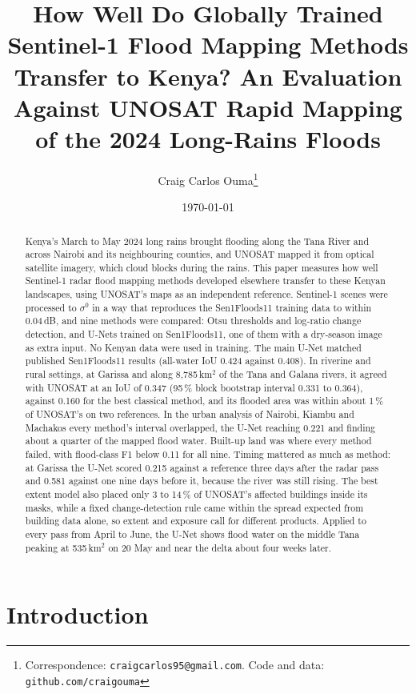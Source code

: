 \documentclass[11pt]{article}
\title{\textbf{How Well Do Globally Trained Sentinel-1 Flood Mapping Methods
Transfer to Kenya? An Evaluation Against UNOSAT Rapid Mapping of the 2024
Long-Rains Floods}}
\author[1]{Craig Carlos Ouma\thanks{%
Correspondence: \texttt{craigcarlos95@gmail.com}. Code and data:
\texttt{github.com/craigouma}}}
\affil[1]{Independent Researcher}
\date{\today}
\begin{document}
\maketitle

\begin{abstract}
\noindent
Kenya's March to May 2024 long rains brought flooding along the Tana River
and across Nairobi and its neighbouring counties, and UNOSAT mapped it from
optical satellite imagery, which cloud blocks during the rains. This paper
measures how well Sentinel-1 radar flood mapping methods developed elsewhere
transfer to these Kenyan landscapes, using UNOSAT's maps as an independent
reference. Sentinel-1 scenes were processed to $\sigma^0$ in a way that
reproduces the Sen1Floods11 training data to within 0.04\,dB, and nine
methods were compared: Otsu thresholds and log-ratio change detection, and
U-Nets trained on Sen1Floods11, one of them with a dry-season image as extra
input. No Kenyan data were used in training. The main U-Net matched published
Sen1Floods11 results (all-water IoU 0.424 against 0.408). In riverine and rural
settings, at Garissa and along 8,785\,km$^2$ of the Tana and Galana rivers, it
agreed with UNOSAT at an IoU of 0.347 (95\,\% block bootstrap interval 0.331 to
0.364), against 0.160 for the best classical method, and its flooded area was
within about 1\,\% of UNOSAT's on two references. In the urban analysis of
Nairobi, Kiambu and Machakos every method's interval overlapped, the U-Net
reaching 0.221 and finding about a quarter of the mapped flood water. Built-up
land was where every method failed, with flood-class F1 below 0.11 for all
nine. Timing mattered as much as method: at Garissa the U-Net scored 0.215
against a reference three days after the radar pass and 0.581 against one
nine days before it, because the river was still rising. The best extent
model also placed only 3 to 14\,\% of UNOSAT's affected buildings inside its
masks, while a fixed change-detection rule came within the spread expected
from building data alone, so extent and exposure call for different products.
Applied to every pass from April to June, the U-Net shows flood water on the
middle Tana peaking at 535\,km$^2$ on 20 May and near the delta about four
weeks later.
\end{abstract}

\section{Introduction}
\label{sec:intro}
\end{document}
